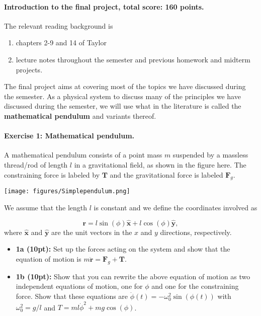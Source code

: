 \documentclass[%
oneside,                 %
final,                   %
10pt]{article}
\begin{document}
\noindent
\paragraph{Introduction to the final project, total score: 160  points.}
The relevant reading background is
\begin{enumerate}
\item chapters 2-9 and 14 of Taylor

\item lecture notes throughout the semester and previous homework and midterm projects.
\end{enumerate}

\noindent
The final project aims at covering most of the topics we have discussed during the semester. As a physical system to discuss many of the principles we have discussed during the semester, we will use what in the literature is called the \textbf{mathematical pendulum} and variants thereof. 

\paragraph{Exercise 1: Mathematical pendulum.}
A mathematical pendulum consists of a point mass $m$ suspended by a massless thread/rod of length $l$ in a gravitational field, as shown in the figure here. The constraining force is labeled by $\bm{T}$
and the gravitational force is labeled $\bm{F}_g$.



\vspace{6mm}

\centerline{\texttt{[image: figures/Simplependulum.png]}}

\vspace{6mm}



We assume that the length $l$ is constant and we define the coordinates involved as

\[
\bm{r} = l\sin(\phi)\bm{\hat{x}}+l\cos(\phi)\bm{\hat{y}},
\]
where $\bm{\hat{x}}$ and $\bm{\hat{y}}$ are the unit vectors in the $x$ and $y$ directions, respectively.

\begin{itemize}
\item \textbf{1a (10pt):} Set up the forces acting on the system and show that the equation of motion is $m\ddot{\bm{r}}=\bm{F}_g+\bm{T}$.

\item \textbf{1b (10pt):} Show that you can rewrite the above equation of motion as two independent equations of motion, one for $\phi$ and one for the constraining force. Show that these equations are $\ddot{\phi}(t)=-\omega_0^2\sin{(\phi(t))}$ with $\omega_0^2=g/l$ and $T=ml\dot{\phi}^2+mg\cos{(\phi)}$.
\end{itemize}
\end{document}
